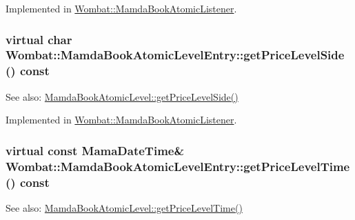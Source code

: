 Implemented in \hyperlink{classWombat_1_1MamdaBookAtomicListener_9bbc72a64bd32fba449ba581b369a980}{Wombat::Mamda\-Book\-Atomic\-Listener}.\hypertarget{classWombat_1_1MamdaBookAtomicLevelEntry_d88e0d4cbd92ef03b612fb9dc7e60ded}{
\subsubsection[getPriceLevelSide]{\setlength{\rightskip}{0pt plus 5cm}virtual char Wombat::Mamda\-Book\-Atomic\-Level\-Entry::get\-Price\-Level\-Side () const}}
\label{classWombat_1_1MamdaBookAtomicLevelEntry_d88e0d4cbd92ef03b612fb9dc7e60ded}


\begin{Desc}
\item[See also:]\hyperlink{classWombat_1_1MamdaBookAtomicLevel_db64c3729d50e3334a5d1eeb40aba6a4}{Mamda\-Book\-Atomic\-Level::get\-Price\-Level\-Side()} \end{Desc}


Implemented in \hyperlink{classWombat_1_1MamdaBookAtomicListener_3031081549b1df511c872068f58e8ade}{Wombat::Mamda\-Book\-Atomic\-Listener}.\hypertarget{classWombat_1_1MamdaBookAtomicLevelEntry_690eb5e3517b64ba86681eabd71a2b02}{
\subsubsection[getPriceLevelTime]{\setlength{\rightskip}{0pt plus 5cm}virtual const Mama\-Date\-Time\& Wombat::Mamda\-Book\-Atomic\-Level\-Entry::get\-Price\-Level\-Time () const}}
\label{classWombat_1_1MamdaBookAtomicLevelEntry_690eb5e3517b64ba86681eabd71a2b02}


\begin{Desc}
\item[See also:]\hyperlink{classWombat_1_1MamdaBookAtomicLevel_8eebd8c5bc48668b4f42afdcfa2e11ff}{Mamda\-Book\-Atomic\-Level::get\-Price\-Level\-Time()} \end{Desc}


